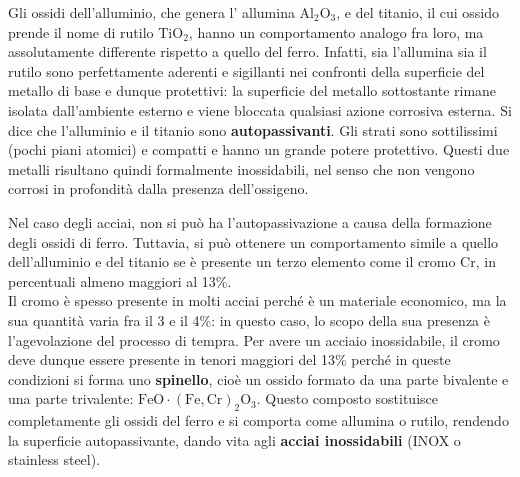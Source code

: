 Gli ossidi dell’alluminio, che genera l’ allumina $\mathrm{Al_2O_3}$, e del titanio, il cui ossido prende il nome di rutilo $\mathrm{TiO_2}$, hanno un comportamento analogo fra loro, ma assolutamente differente rispetto a quello del ferro. Infatti, sia l’allumina sia il rutilo sono perfettamente aderenti e sigillanti nei confronti della superficie del metallo di base e dunque protettivi: la superficie del metallo sottostante rimane isolata dall’ambiente esterno e viene bloccata qualsiasi azione corrosiva esterna. Si dice che l’alluminio e il titanio sono \textbf{autopassivanti}. Gli strati sono sottilissimi (pochi piani atomici) e compatti e hanno un grande potere protettivo. Questi due metalli risultano quindi formalmente inossidabili, nel senso che non vengono corrosi in profondità dalla presenza dell'ossigeno.

Nel caso degli acciai, non si può ha l’autopassivazione a causa della formazione degli ossidi di ferro. 
Tuttavia, si può ottenere un comportamento simile a quello dell’alluminio e del titanio  se è presente un terzo elemento come il cromo Cr, in percentuali almeno maggiori al 13\%.\\
Il cromo è spesso presente in molti acciai perché è un materiale economico, ma la sua quantità varia fra il 3 e il 4\%: in questo caso, lo scopo della sua presenza è l’agevolazione del processo di tempra.
Per avere un acciaio inossidabile, il cromo deve dunque essere presente in tenori maggiori del 13\% perché in queste condizioni si forma uno \textbf{spinello}, cioè un ossido formato da una parte bivalente e una parte trivalente: $\mathrm{FeO\cdot(Fe,Cr)_2O_3}$.
Questo composto sostituisce completamente gli ossidi del ferro e si comporta come allumina o rutilo, rendendo la superficie autopassivante, dando vita agli \textbf{acciai inossidabili} (INOX o stainless steel).

